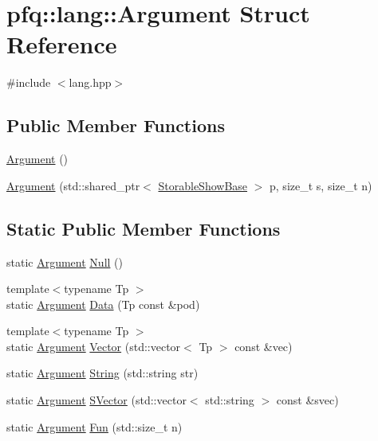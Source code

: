 \hypertarget{structpfq_1_1lang_1_1Argument}{\section{pfq\+:\+:lang\+:\+:Argument Struct Reference}
\label{structpfq_1_1lang_1_1Argument}
}


{\ttfamily \#include $<$lang.\+hpp$>$}

\subsection*{Public Member Functions}
\begin{DoxyCompactItemize}
\item 
\hyperlink{structpfq_1_1lang_1_1Argument_afaf71c8c26efb0217437393eadf43d9e}{Argument} ()
\item 
\hyperlink{structpfq_1_1lang_1_1Argument_aa5bb138a6566a3c17c6b9ab87ceefa7a}{Argument} (std\+::shared\+\_\+ptr$<$ \hyperlink{structpfq_1_1lang_1_1StorableShowBase}{Storable\+Show\+Base} $>$ p, size\+\_\+t s, size\+\_\+t n)
\end{DoxyCompactItemize}
\subsection*{Static Public Member Functions}
\begin{DoxyCompactItemize}
\item 
static \hyperlink{structpfq_1_1lang_1_1Argument}{Argument} \hyperlink{structpfq_1_1lang_1_1Argument_a47b27b590b495ac9e990d850f3052aad}{Null} ()
\item 
{\footnotesize template$<$typename Tp $>$ }\\static \hyperlink{structpfq_1_1lang_1_1Argument}{Argument} \hyperlink{structpfq_1_1lang_1_1Argument_ae9ded6ceab4dd43be420763bed00f2c3}{Data} (Tp const \&pod)
\item 
{\footnotesize template$<$typename Tp $>$ }\\static \hyperlink{structpfq_1_1lang_1_1Argument}{Argument} \hyperlink{structpfq_1_1lang_1_1Argument_a4dc906b330284d955fdc699ea3217da5}{Vector} (std\+::vector$<$ Tp $>$ const \&vec)
\item 
static \hyperlink{structpfq_1_1lang_1_1Argument}{Argument} \hyperlink{structpfq_1_1lang_1_1Argument_aba384bb2905edc62d6700a0d61f6b05b}{String} (std\+::string str)
\item 
static \hyperlink{structpfq_1_1lang_1_1Argument}{Argument} \hyperlink{structpfq_1_1lang_1_1Argument_ae01b308812cd388a46bcfcddb645f09d}{S\+Vector} (std\+::vector$<$ std\+::string $>$ const \&svec)
\item 
static \hyperlink{structpfq_1_1lang_1_1Argument}{Argument} \hyperlink{structpfq_1_1lang_1_1Argument_a774e93098c8bc9f3472facd7ddeb08ca}{Fun} (std\+::size\+\_\+t n)
\end{DoxyCompactItemize}
